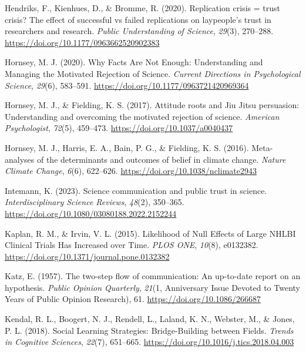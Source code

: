\documentclass[
  jou,
  floatsintext,
  longtable,
  nolmodern,
  notxfonts,
  notimes,
  colorlinks=true,linkcolor=blue,citecolor=blue,urlcolor=blue]{apa7}
\newlength{\cslhangindent}
\newenvironment{CSLReferences}[2] %
 {\begin{list}{}{%
  \setlength{\itemindent}{0pt}
  \setlength{\leftmargin}{0pt}
  \setlength{\parsep}{0pt}
  \ifodd #1
   \setlength{\leftmargin}{\cslhangindent}
   \setlength{\itemindent}{-1\cslhangindent}
  \fi
  \setlength{\itemsep}{#2\baselineskip}}}
 {\end{list}}
\begin{document}
\begin{CSLReferences}{1}{0}
Hendriks, F., Kienhues, D., \& Bromme, R. (2020). Replication crisis =
trust crisis? The effect of successful vs failed replications on
laypeople{'}s trust in researchers and research. \emph{Public
Understanding of Science}, \emph{29}(3), 270--288.
\url{https://doi.org/10.1177/0963662520902383}

Hornsey, M. J. (2020). Why Facts Are Not Enough: Understanding and
Managing the Motivated Rejection of Science. \emph{Current Directions in
Psychological Science}, \emph{29}(6), 583--591.
\url{https://doi.org/10.1177/0963721420969364}

Hornsey, M. J., \& Fielding, K. S. (2017). Attitude roots and Jiu Jitsu
persuasion: Understanding and overcoming the motivated rejection of
science. \emph{American Psychologist}, \emph{72}(5), 459--473.
\url{https://doi.org/10.1037/a0040437}

Hornsey, M. J., Harris, E. A., Bain, P. G., \& Fielding, K. S. (2016).
Meta-analyses of the determinants and outcomes of belief in climate
change. \emph{Nature Climate Change}, \emph{6}(6), 622--626.
\url{https://doi.org/10.1038/nclimate2943}

Intemann, K. (2023). Science communication and public trust in science.
\emph{Interdisciplinary Science Reviews}, \emph{48}(2), 350--365.
\url{https://doi.org/10.1080/03080188.2022.2152244}

Kaplan, R. M., \& Irvin, V. L. (2015). Likelihood of Null Effects of
Large NHLBI Clinical Trials Has Increased over Time. \emph{PLOS ONE},
\emph{10}(8), e0132382.
\url{https://doi.org/10.1371/journal.pone.0132382}

Katz, E. (1957). The two-step flow of communication: An up-to-date
report on an hypothesis. \emph{Public Opinion Quarterly}, \emph{21}(1,
Anniversary Issue Devoted to Twenty Years of Public Opinion Research),
61. \url{https://doi.org/10.1086/266687}

Kendal, R. L., Boogert, N. J., Rendell, L., Laland, K. N., Webster, M.,
\& Jones, P. L. (2018). Social Learning Strategies: Bridge-Building
between Fields. \emph{Trends in Cognitive Sciences}, \emph{22}(7),
651--665. \url{https://doi.org/10.1016/j.tics.2018.04.003}


\end{CSLReferences}
\end{document}
